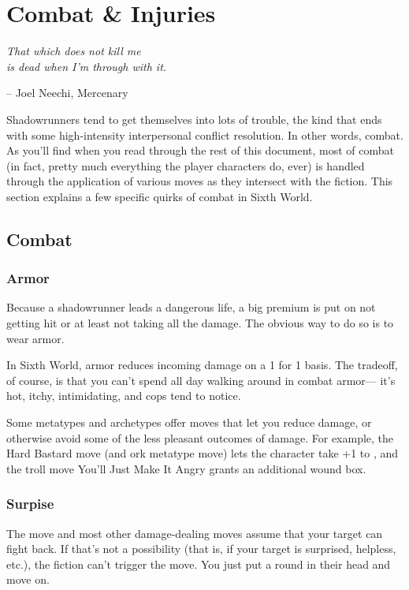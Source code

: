 \chapter{Combat \& Injuries} \label{combat}

\epigraph{\textit{That which does not kill me \\ is dead when I'm through with it.}}{-- Joel Neechi, Mercenary}

Shadowrunners tend to get themselves into lots of trouble, the kind that ends with some high-intensity interpersonal conflict resolution. In other words, combat. As you’ll find when you read through the rest of this document, most of combat (in fact, pretty much everything the player characters do, ever) is handled through the application of various moves as they intersect with the fiction. This section explains a few specific quirks of combat in Sixth World.


\section{Combat}
\subsection*{Armor}
Because a shadowrunner leads a dangerous life, a big premium is put on not getting hit or at least not taking all the damage. The obvious way to do so is to wear armor.

In Sixth World, armor reduces incoming damage on a 1 for 1 basis. The tradeoff, of course, is that you can’t spend all day walking around in combat armor— it’s hot, itchy, intimidating, and cops tend to notice.

Some metatypes and archetypes offer moves that let you reduce damage, or otherwise avoid some of the less pleasant outcomes of damage. For example, the Hard Bastard move (and ork metatype move) lets the character take +1 to , and the troll move You’ll Just Make It Angry grants an additional wound box.



\subsection*{Surpise}
The  move and most other damage-dealing moves assume that your target can fight back. If that’s not a possibility (that is, if your target is surprised, helpless, etc.), the fiction can’t trigger the  move. You just put a round in their head and move on.

